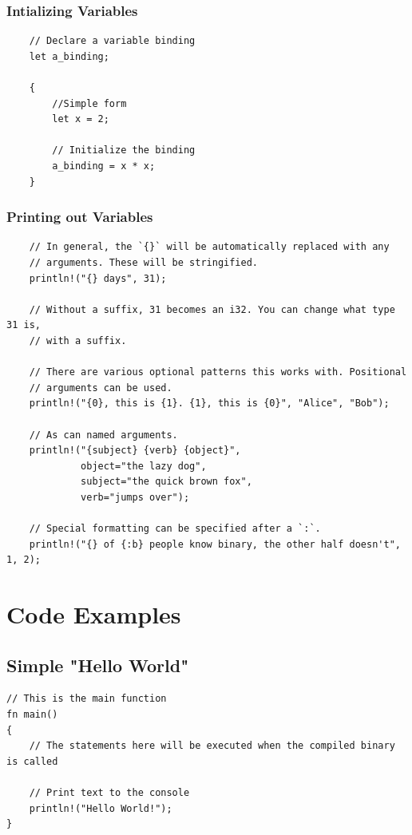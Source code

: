 \documentclass{article}
\begin{document}
\subsubsection*{Intializing Variables}
\begin{verbatim}
    // Declare a variable binding
    let a_binding;

    {
        //Simple form
        let x = 2;

        // Initialize the binding
        a_binding = x * x;
    }
\end{verbatim}
\subsubsection*{Printing out Variables}
\begin{verbatim}
    // In general, the `{}` will be automatically replaced with any
    // arguments. These will be stringified.
    println!("{} days", 31);

    // Without a suffix, 31 becomes an i32. You can change what type 31 is,
    // with a suffix.

    // There are various optional patterns this works with. Positional
    // arguments can be used.
    println!("{0}, this is {1}. {1}, this is {0}", "Alice", "Bob");

    // As can named arguments.
    println!("{subject} {verb} {object}",
             object="the lazy dog",
             subject="the quick brown fox",
             verb="jumps over");

    // Special formatting can be specified after a `:`.
    println!("{} of {:b} people know binary, the other half doesn't", 1, 2);
\end{verbatim}

\section*{Code Examples\cite{code:rust}}

\subsection*{Simple "Hello World"}
\begin{verbatim}
// This is the main function
fn main()
{
    // The statements here will be executed when the compiled binary is called

    // Print text to the console
    println!("Hello World!");
}

\end{verbatim}
\end{document}
